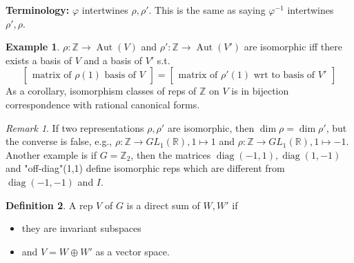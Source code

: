 \documentclass{article}
\theoremstyle{definition}
\newtheorem{defn}{Definition}[section]
\newtheorem{example}[defn]{Example}
\theoremstyle{remark}
\newtheorem{rem}{Remark}
\theoremstyle{plain}
\newcommand{\ZZ}{\mathbb{Z}}
\newcommand{\RR}{\mathbb{R}}
\begin{document}
\textbf{Terminology:} $\varphi$ intertwines $\rho,\rho'$. This is the same as saying $\varphi^{-1}$ intertwines $\rho',\rho$.
\begin{example}
    $\rho:\ZZ\to\operatorname{Aut}(V)$ and $\rho':\ZZ\to\operatorname{Aut}(V')$ are isomorphic iff there exists a basis of $V$ and a basis of $V'$ s.t. 
    \[\begin{bmatrix}\text{matrix of }\rho(1)\text{ basis of }V\end{bmatrix}=\begin{bmatrix}
        \text{matrix of }\rho'(1)\text{ wrt to basis of }V'
    \end{bmatrix}\]
    As a corollary, isomorphism classes of reps of $\ZZ$ on $V$ is in bijection correspondence with rational canonical forms.
\end{example}
\begin{rem}
    If two representations $\rho,\rho'$ are isomorphic, then $\dim\rho=\dim\rho'$, but the converse is false, e.g., $\rho:\ZZ\to GL_1(\RR),1\mapsto 1$ and $\rho:\ZZ\to GL_1(\RR), 1\mapsto -1$. Another example is if $G=\ZZ_2$, then the matrices $\operatorname{diag}(-1,1),\operatorname{diag}(1,-1)$ and "off-diag"(1,1) define isomorphic reps which are different from $\operatorname{diag}(-1,-1)$ and $I$.
\end{rem}
    
 \begin{defn}
     A rep $V$ of $G$ is a direct sum of $W,W'$ if 
     \begin{itemize}
         \item they are invariant subspaces
         \item and $V=W\oplus W'$ as a vector space.
     \end{itemize}
 \end{defn}
\end{document}
